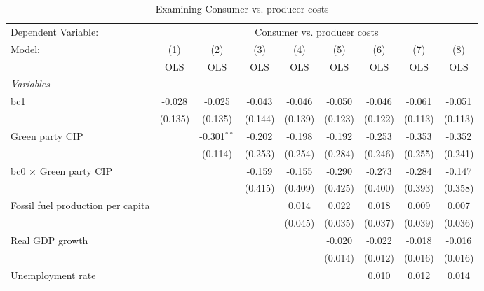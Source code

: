 
\begin{table}[htbp]
   \caption{Examining Consumer vs. producer costs}
   \centering
   \begin{tabular}{lcccccccc}
      \toprule
      Dependent Variable: & \multicolumn{8}{c}{Consumer vs. producer costs}\\
      Model:                                  & (1)     & (2)           & (3)     & (4)     & (5)     & (6)     & (7)     & (8)\\  
                                              &  OLS    & OLS           & OLS     & OLS     & OLS     & OLS     & OLS     & OLS\\  
      \midrule
      \emph{Variables}\\
      bc1                                     & -0.028  & -0.025        & -0.043  & -0.046  & -0.050  & -0.046  & -0.061  & -0.051\\   
                                              & (0.135) & (0.135)       & (0.144) & (0.139) & (0.123) & (0.122) & (0.113) & (0.113)\\   
      Green party CIP                         &         & -0.301$^{**}$ & -0.202  & -0.198  & -0.192  & -0.253  & -0.353  & -0.352\\   
                                              &         & (0.114)       & (0.253) & (0.254) & (0.284) & (0.246) & (0.255) & (0.241)\\   
      bc0 $\times$ Green party CIP            &         &               & -0.159  & -0.155  & -0.290  & -0.273  & -0.284  & -0.147\\   
                                              &         &               & (0.415) & (0.409) & (0.425) & (0.400) & (0.393) & (0.358)\\   
      Fossil fuel production per capita       &         &               &         & 0.014   & 0.022   & 0.018   & 0.009   & 0.007\\   
                                              &         &               &         & (0.045) & (0.035) & (0.037) & (0.039) & (0.036)\\   
      Real GDP growth                         &         &               &         &         & -0.020  & -0.022  & -0.018  & -0.016\\   
                                              &         &               &         &         & (0.014) & (0.012) & (0.016) & (0.016)\\   
      Unemployment rate                       &         &               &         &         &         & 0.010   & 0.012   & 0.014\\   

\end{tabular}
\end{table}
